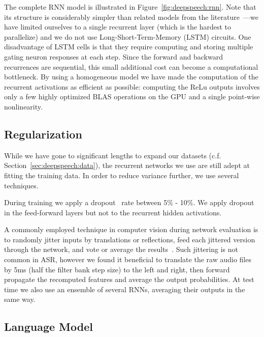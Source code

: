 The complete RNN model is illustrated in Figure~\ref{fig:deepspeech:rnn}. Note
that its structure is considerably simpler than related models from the
literature~\cite{graves2014}---we have limited ourselves to a single recurrent
layer (which is the hardest to parallelize) and we do not use
Long-Short-Term-Memory (LSTM) circuits. One disadvantage of LSTM cells is that
they require computing and storing multiple gating neuron responses at each
step. Since the forward and backward recurrences are sequential, this small
additional cost can become a computational bottleneck. By using a homogeneous
model we have made the computation of the recurrent activations as efficient as
possible: computing the ReLu outputs involves only a few highly optimized BLAS
operations on the GPU and a single point-wise nonlinearity.

\subsection{Regularization}

While we have gone to significant lengths to expand our datasets (c.f.
Section~\ref{sec:deepspeech:data}), the recurrent networks we use are still
adept at fitting the training data. In order to reduce variance further, we use
several techniques.  

During training we apply a dropout~\cite{hinton2012dropout} rate between 5\% -
10\%. We apply dropout in the feed-forward layers but not to the recurrent
hidden activations.

A commonly employed technique in computer vision during network evaluation is
to randomly jitter inputs by translations or reflections, feed each jittered
version through the network, and vote or average the
results~\cite{krizhevsky2012imagenet}. Such jittering is not common in ASR,
however we found it beneficial to translate the raw audio files by 5ms (half
the filter bank step size) to the left and right, then forward propagate the
recomputed features and average the output probabilities. At test time we also
use an ensemble of several RNNs, averaging their outputs in the same way.

\subsection{Language Model}

